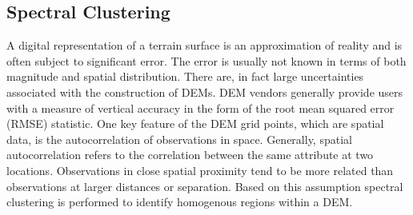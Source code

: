 \documentclass[12pt,letterpaper]{article}
\begin{document}
\subsection{Spectral Clustering}
A digital representation of a terrain surface is an approximation of reality and is often subject to significant 
error. The error is usually not known in terms of both magnitude and spatial distribution. There are, in fact 
large uncertainties associated with the construction of DEMs. DEM vendors generally provide users with a
measure of vertical accuracy in the form of the root mean squared error (RMSE) statistic. One key feature of 
the DEM grid points, which are spatial data, is the autocorrelation of observations in space.  Generally, spatial 
autocorrelation refers to the correlation between the same attribute at two locations. Observations in close 
spatial proximity tend to be more related than observations at larger distances or separation. Based on this
assumption spectral clustering is performed to identify homogenous regions within a DEM. %
\end{document}
